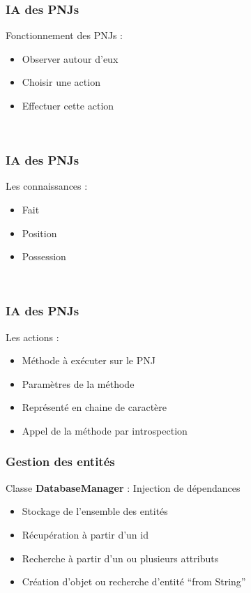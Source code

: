 \documentclass{beamer}
\begin{document}
\begin{frame}
  \frametitle{IA des PNJs}
  Fonctionnement des PNJs :
  \begin{itemize}
  \item Observer autour d'eux
  \item Choisir une action
  \item Effectuer cette action
  \end{itemize}
  ~\\  
\end{frame}

\begin{frame}
  \frametitle{IA des PNJs}
  Les connaissances :
  \begin{itemize}
  \item Fait
  \item Position
  \item Possession
  \end{itemize}
  ~\\
\end{frame}

\begin{frame}
  \frametitle{IA des PNJs}
  Les actions :
  \begin{itemize}
  \item Méthode à exécuter sur le PNJ
  \item Paramètres de la méthode
  \item Représenté en chaine de caractère
  \item Appel de la méthode par introspection
  \end{itemize}
\end{frame}


\begin{frame}
  \frametitle{Gestion des entités}
  Classe \textbf{DatabaseManager} : Injection de dépendances
  \begin{itemize}
  \item Stockage de l'ensemble des entités
  \item Récupération à partir d'un id
  \item Recherche à partir d'un ou plusieurs attributs
  \item Création d'objet ou recherche d'entité ``from String''
  \end{itemize}
\end{frame}
\end{document}
